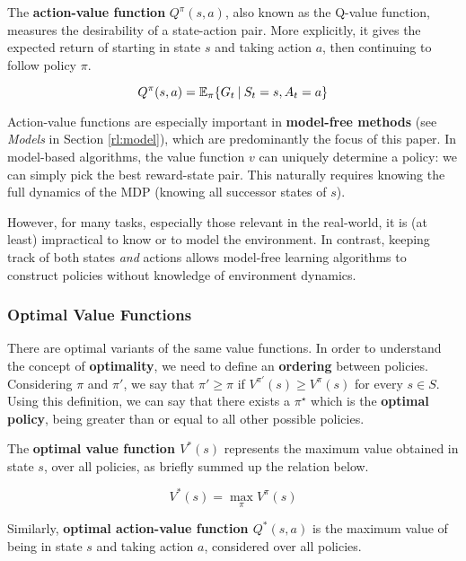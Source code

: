 The \textbf{action-value function} \(Q^{\pi}(s, a)\), also known as the Q-value function, measures the desirability of a state-action pair.
More explicitly, it gives the expected return of starting in state $s$ and taking action $a$, then continuing to follow policy $\pi$.

\begin{equation}
    Q^{\pi}(s, a) = \mathbb{E}_{\pi}\{ G_t \:\vert\: S_t = s, A_t = a \}
\end{equation}

Action-value functions are especially important in \textbf{model-free methods} (see \emph{Models} in Section \ref{rl:model}), which are predominantly the focus of this paper.
In model-based algorithms, the value function $v$ can uniquely determine a policy: we can simply pick the best reward-state pair.
This naturally requires knowing the full dynamics of the MDP (knowing all successor states of $s$).

However, for many tasks, especially those relevant in the real-world, it is (at least) impractical to know or to model the environment.
In contrast, keeping track of both states \emph{and} actions allows model-free learning algorithms to construct policies without knowledge of environment dynamics.

\subsubsection{Optimal Value Functions}

There are optimal variants of the same value functions.
In order to understand the concept of \textbf{optimality}, we need to define an \textbf{ordering} between policies.
Considering $\pi$ and $\pi'$, we say that $\pi' \geq \pi$ if $V^{\pi'}(s) \geq V^{\pi}(s)$ for every $s \in S$.
Using this definition, we can say that there exists a $\pi^{\star}$ which is the \textbf{optimal policy}, being greater than or equal to all other possible policies.

The \textbf{optimal value function $V^*(s)$} represents the maximum value obtained in state $s$, over all policies, as briefly summed up the relation below.

\begin{equation} \label{eqn:opt-value-fun}
    V^*(s) = \max_{\pi}{V^{\pi}(s)}
\end{equation}

Similarly, \textbf{optimal action-value function $Q^*(s, a)$} is the maximum value of being in state $s$ and taking action $a$, considered over all policies.

